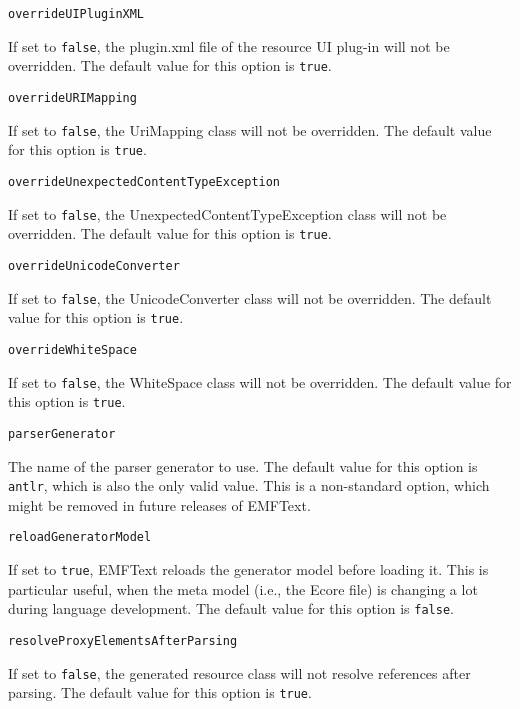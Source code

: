 \noindent\texttt{overrideUIPluginXML}
\begin{myindentpar}{1cm}
If set to \texttt{false}, the plugin.xml file of the resource UI plug-in will not be overridden. The default value for this option is \texttt{true}.
\end{myindentpar}

\noindent\texttt{overrideURIMapping}
\begin{myindentpar}{1cm}
If set to \texttt{false}, the UriMapping class will not be overridden. The default value for this option is \texttt{true}.
\end{myindentpar}

\noindent\texttt{overrideUnexpectedContentTypeException}
\begin{myindentpar}{1cm}
If set to \texttt{false}, the UnexpectedContentTypeException class will not be overridden. The default value for this option is \texttt{true}.
\end{myindentpar}

\noindent\texttt{overrideUnicodeConverter}
\begin{myindentpar}{1cm}
If set to \texttt{false}, the UnicodeConverter class will not be overridden. The default value for this option is \texttt{true}.
\end{myindentpar}

\noindent\texttt{overrideWhiteSpace}
\begin{myindentpar}{1cm}
If set to \texttt{false}, the WhiteSpace class will not be overridden. The default value for this option is \texttt{true}.
\end{myindentpar}

\noindent\texttt{parserGenerator}
\begin{myindentpar}{1cm}
The name of the parser generator to use. The default value for this option is \texttt{antlr}, which is also the only valid value. This is a non-standard option, which might be removed in future releases of EMFText.
\end{myindentpar}

\noindent\texttt{reloadGeneratorModel}
\begin{myindentpar}{1cm}
If set to \texttt{true}, EMFText reloads the generator model before loading it. This is particular useful, when the meta model (i.e., the Ecore file) is changing a lot during language development. The default value for this option is \texttt{false}.
\end{myindentpar}

\noindent\texttt{resolveProxyElementsAfterParsing}
\begin{myindentpar}{1cm}
If set to \texttt{false}, the generated resource class will not resolve references after parsing. The default value for this option is \texttt{true}.
\end{myindentpar}

